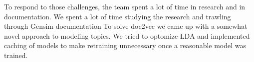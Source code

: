 To respond to those challenges, the team spent a lot of time in
research and in documentation.
We spent a lot of time studying the research and trawling through
Gensim documentation
To solve doc2vec we came up with a somewhat novel approach to
modeling topics.
We tried to optomize LDA and implemented caching of models to make
retraining unnecessary once a reasonable model was trained.  

